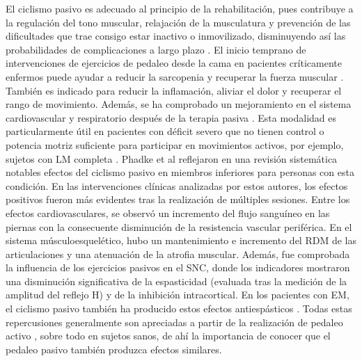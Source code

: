 \vspace{5pt}
El ciclismo pasivo es adecuado al principio de la rehabilitación, pues contribuye a la
regulación del tono muscular, relajación de la musculatura y prevención de las dificultades
que trae consigo estar inactivo o inmovilizado, disminuyendo así las probabilidades de
complicaciones a largo plazo \cite{cruz2009guia}. El inicio temprano de intervenciones de ejercicios de
pedaleo desde la cama en pacientes críticamente enfermos puede ayudar a reducir la
sarcopenia y recuperar la fuerza muscular \cite{nickels2020acceptability}. También es indicado para reducir la
inflamación, aliviar el dolor y recuperar el rango de movimiento. Además, se ha
comprobado un mejoramiento en el sistema cardiovascular y respiratorio después de la
terapia pasiva \cite{cruz2009guia, phadke2019impact}.
Esta modalidad es particularmente útil en pacientes con déficit severo que no tienen
control o potencia motriz suficiente para participar en movimientos activos, por ejemplo,
sujetos con LM completa \cite{phadke2019impact, nardone2017passive}. Phadke et al \cite{phadke2019impact} reflejaron en una revisión sistemática
notables efectos del ciclismo pasivo en miembros inferiores para personas con esta
condición. En las intervenciones clínicas analizadas por estos autores, los efectos
positivos fueron más evidentes tras la realización de múltiples sesiones. Entre los efectos
cardiovasculares, se observó un incremento del flujo sanguíneo en las piernas con la
consecuente disminución de la resistencia vascular periférica. En el sistema
músculoesquelético, hubo un mantenimiento e incremento del RDM de las articulaciones
y una atenuación de la atrofia muscular. Además, fue comprobada la influencia de los
ejercicios pasivos en el SNC, donde los indicadores mostraron una disminución
significativa de la espasticidad (evaluada tras la medición de la amplitud del reflejo H) y
de la inhibición intracortical. En los pacientes con EM, el ciclismo pasivo también ha
producido estos efectos antiespásticos \cite{motl2006effect, guyot2012effects}. Todas estas repercusiones generalmente
son apreciadas a partir de la realización de pedaleo activo \cite{nardone2016effects}, sobre todo en sujetos
sanos, de ahí la importancia de conocer que el pedaleo pasivo también produzca efectos
similares.

